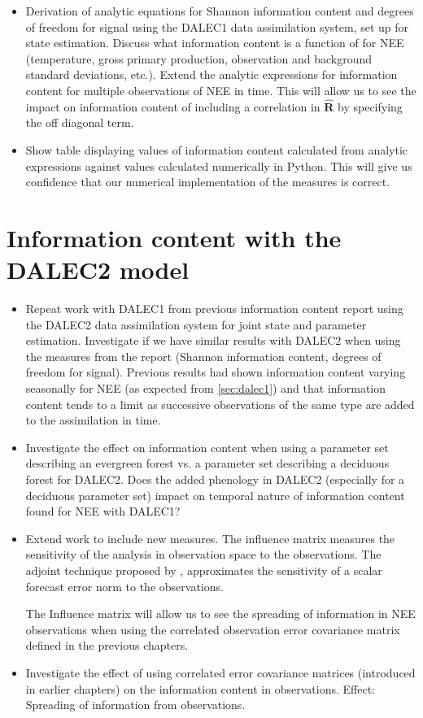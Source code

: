 \documentclass[11pt]{article}
\begin{document}
\begin{itemize}
\item Derivation of analytic equations for Shannon information content and degrees of freedom for signal using the DALEC1 data assimilation system, set up for state estimation. Discuss what information content is a function of for NEE (temperature, gross primary production, observation and background standard deviations, etc.). Extend the analytic expressions for information content for multiple observations of NEE in time. This will allow us to see the impact on information content of including a correlation in $\hat{\textbf{R}}$ by specifying the off diagonal term.

\item Show table displaying values of information content calculated from analytic expressions against values calculated numerically in Python. This will give us confidence that our numerical implementation of the measures is correct.
\end{itemize}

\section{Information content with the DALEC2 model}
\begin{itemize}
\item Repeat work with DALEC1 from previous information content report using the DALEC2 data assimilation system for joint state and parameter estimation. Investigate if we have similar results with DALEC2 when using the measures from the report (Shannon information content, degrees of freedom for signal). Previous results had shown information content varying seasonally for NEE (as expected from \ref{sec:dalec1}) and that information content tends to a limit as successive observations of the same type are added to the assimilation in time. 

\item Investigate the effect on information content when using a parameter set describing an evergreen forest vs. a parameter set describing a deciduous forest for DALEC2. Does the added phenology in DALEC2 (especially for a deciduous parameter set) impact on temporal nature of information content found for NEE with DALEC1? 

\item Extend work to include new measures. The \citet{Cardinali2004} influence matrix measures the sensitivity of the analysis in observation space to the observations. The adjoint technique proposed by \citet{Langland2004}, approximates the sensitivity of a scalar forecast error norm to the observations. 

The Influence matrix will allow us to see the spreading of information in NEE observations when using the correlated observation error covariance matrix defined in the previous chapters.

\item Investigate the effect of using correlated error covariance matrices (introduced in earlier chapters) on the information content in observations. Effect: Spreading of information from observations.
\end{itemize}
\end{document}
